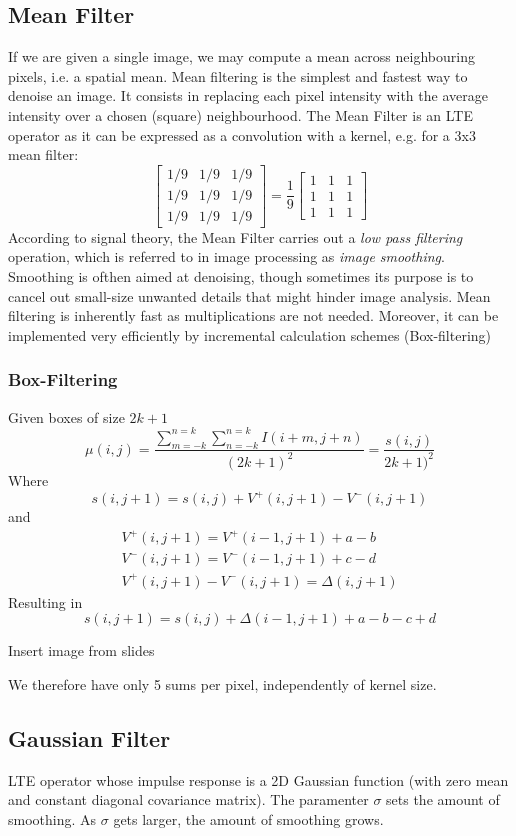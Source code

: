 \documentclass{article}
\begin{document}
\subsection{Mean Filter}
If we are given a single image, we may compute a mean across neighbouring pixels, i.e. a spatial mean. Mean filtering is the simplest and fastest way to denoise an image. It consists in replacing each pixel intensity with the average intensity over a chosen (square) neighbourhood. The Mean Filter is an LTE operator as it can be expressed as a convolution with a kernel, e.g. for a  3x3 mean filter:
\[
    \begin{bmatrix}
        1/9 & 1/9 & 1/9 \\
        1/9 & 1/9 & 1/9 \\
        1/9 & 1/9 & 1/9
        \end{bmatrix} = \frac{1}{9} \begin{bmatrix}
        1 & 1 & 1 \\
        1 & 1 & 1 \\
        1 & 1 & 1 
    \end{bmatrix}
\]
According to signal theory, the Mean Filter carries out a \emph{low pass filtering} operation, which is referred to in image processing as \emph{image smoothing}. Smoothing is ofthen aimed at denoising, though sometimes its purpose is to cancel out small-size unwanted details that might hinder image analysis. Mean filtering is inherently fast as multiplications are not needed. Moreover, it can be implemented very efficiently by incremental calculation schemes (Box-filtering)
\subsubsection{Box-Filtering}
Given boxes of size $2k+1$
\[
    \mu (i,j) = \frac{\sum_{m=-k}^{n=k}\sum_{n=-k}^{n=k} I(i+m,j+n)}{(2k+1)^2}=  \frac{s(i,j)}{2k+1)^2}
\]
Where
\[
    s(i,j+1)=s(i,j)+V^+(i,j+1)-V^-(i,j+1)
\]
and 
\begin{gather*}
    V^+(i,j+1)=V^+(i-1,j+1)+a-b\\
    V^-(i,j+1)=V^-(i-1,j+1)+c-d\\
    V^+(i,j+1)-V^-(i,j+1)=\Delta(i,j+1)
\end{gather*}
Resulting in
\[
    s(i,j+1)=s(i,j)+\Delta(i-1,j+1)+a-b-c+d
\]

Insert image from slides

We therefore have only 5 sums per pixel, independently of kernel size.

\subsection{Gaussian Filter}
LTE operator whose impulse response is a 2D Gaussian function (with zero mean and constant diagonal covariance matrix). The paramenter $\sigma$ sets the amount of smoothing. As $\sigma$ gets larger, the amount of smoothing grows.
\end{document}

